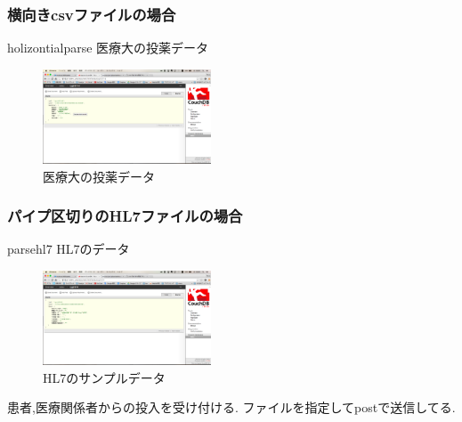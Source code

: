 		\subsubsection{横向きcsvファイルの場合}
			holizontialparse
			医療大の投薬データ
			\\
			\begin{figure}[htbp]
					\includegraphics[width=5cm, bb=0 0 437 688]{./gazou/touyaku.png}
				\caption{医療大の投薬データ}
				\label{ss-mix_sampledata}
			\end{figure}

		\subsubsection{パイプ区切りのHL7ファイルの場合}
			parsehl7
			HL7のデータ
			\\
			\begin{figure}[htbp]
					\includegraphics[width=5cm, bb=0 0 437 688]{./gazou/hl7.png}
				\caption{HL7のサンプルデータ}
				\label{ss-mix_sampledata}
			\end{figure}

	患者,医療関係者からの投入を受け付ける.
	ファイルを指定してpostで送信してる.
